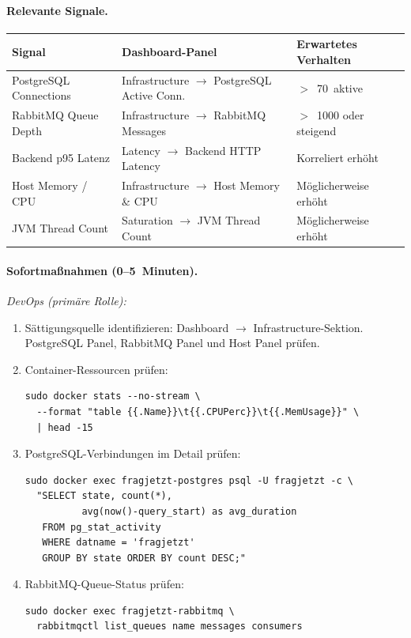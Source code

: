 \paragraph{Relevante Signale.}

\begin{table}[H]
\centering
\small
\begin{tabularx}{\textwidth}{l l >{\RaggedRight\arraybackslash}X}
\toprule
\textbf{Signal} & \textbf{Dashboard-Panel} & \textbf{Erwartetes Verhalten} \\
\midrule
PostgreSQL Connections & Infrastructure $\rightarrow$ PostgreSQL Active Conn. & $>$~70~aktive \\
RabbitMQ Queue Depth & Infrastructure $\rightarrow$ RabbitMQ Messages & $>$~1000 oder steigend \\
Backend p95 Latenz & Latency $\rightarrow$ Backend HTTP Latency & Korreliert erhöht \\
Host Memory / CPU & Infrastructure $\rightarrow$ Host Memory \& CPU & Möglicherweise erhöht \\
JVM Thread Count & Saturation $\rightarrow$ JVM Thread Count & Möglicherweise erhöht \\
\bottomrule
\end{tabularx}
\end{table}

\paragraph{Sofortmaßnahmen (0--5~Minuten).}

\emph{DevOps (primäre Rolle):}
\begin{enumerate}
  \item Sättigungsquelle identifizieren: Dashboard $\rightarrow$ Infrastructure-Sektion. PostgreSQL Panel, RabbitMQ Panel und Host Panel prüfen.
  \item Container-Ressourcen prüfen:
\begin{lstlisting}[style=bashstyle]
sudo docker stats --no-stream \
  --format "table {{.Name}}\t{{.CPUPerc}}\t{{.MemUsage}}" \
  | head -15
\end{lstlisting}
  \item PostgreSQL-Verbindungen im Detail prüfen:
\begin{lstlisting}[style=bashstyle]
sudo docker exec fragjetzt-postgres psql -U fragjetzt -c \
  "SELECT state, count(*),
          avg(now()-query_start) as avg_duration
   FROM pg_stat_activity
   WHERE datname = 'fragjetzt'
   GROUP BY state ORDER BY count DESC;"
\end{lstlisting}
  \item RabbitMQ-Queue-Status prüfen:
\begin{lstlisting}[style=bashstyle]
sudo docker exec fragjetzt-rabbitmq \
  rabbitmqctl list_queues name messages consumers
\end{lstlisting}
\end{enumerate}

